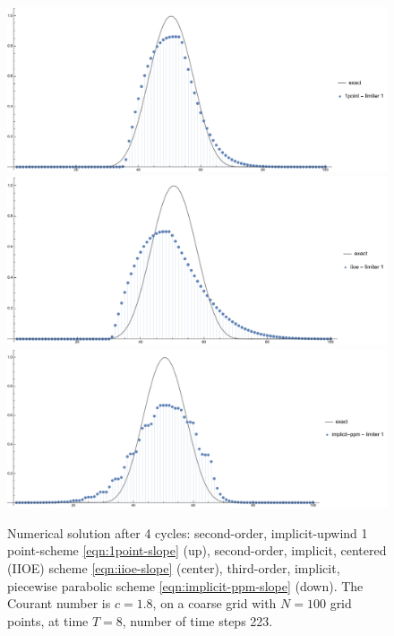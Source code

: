 \documentclass[../thesis.tex]{subfiles}
\begin{document}
\begin{figure}[H]
	\centering
	\includegraphics[width=\textwidth]{fig-1point-c1p8-T8-limit1-smooth.pdf}
	\includegraphics[width=\textwidth]{fig-iioe-c1p8-T8-limit1-smooth.pdf}
	\includegraphics[width=\textwidth]{fig-implicit-ppm-c1p8-T8-limit1-smooth.pdf}
	\caption{Numerical solution after 4 cycles: second-order, implicit-upwind 1 point-scheme \eqref{eqn:1point-slope} (up), second-order, implicit, centered (IIOE) scheme \eqref{eqn:iioe-slope} (center), third-order, implicit, piecewise parabolic scheme \eqref{eqn:implicit-ppm-slope} (down). The Courant number is \(c = 1.8\), on a coarse grid with \(N = 100\) grid points, at time \(T = 8\), number of time steps 223.}
	\label{fig:c1p8-T8-limit1-smooth}
\end{figure}
\end{document}
